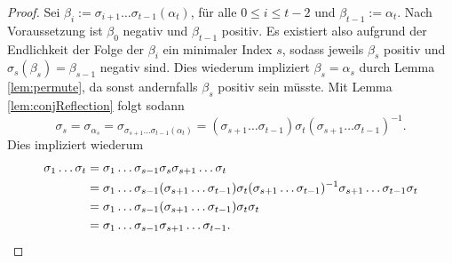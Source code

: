 \begin{proof}
  Sei $\beta_i := \sigma_{i + 1} \dots \sigma_{t-1}(\alpha_t)$, für alle $0 \leq i \leq t - 2$ und $\beta_{t - 1} := \alpha_t$.
  Nach Voraussetzung ist $\beta_0$ negativ und $\beta_{t - 1}$ positiv.
  Es existiert also aufgrund der Endlichkeit der Folge der $\beta_i$ ein minimaler Index $s$, sodass jeweils $\beta_s$ positiv und $\sigma_s(\beta_s) = \beta_{s - 1}$ negativ sind.
  Dies wiederum impliziert $\beta_s = \alpha_s$ durch Lemma \ref{lem:permute}, da sonst andernfalls $\beta_s$ positiv sein müsste.
  Mit Lemma \ref{lem:conjReflection} folgt sodann
  \begin{displaymath}
    \sigma_s 
    = \sigma_{\alpha_s} 
    = \sigma_{\sigma_{s+1} \dots \sigma_{t - 1}(\alpha_t)}
    = (\sigma_{s+1} \dots \sigma_{t - 1}) \sigma_{t} (\sigma_{s+1} \dots \sigma_{t - 1})^{-1}.
  \end{displaymath}
  Dies impliziert wiederum
  \begin{align*}
    \sigma_1 \dots \sigma_t 
    &= \sigma_1 \dots \sigma_{s - 1} \sigma_s \sigma_{s+1} \dots \sigma_t \\
    &= \sigma_1 \dots \sigma_{s - 1} (\sigma_{s+1} \dots \sigma_{t - 1}) \sigma_{t} (\sigma_{s+1} \dots \sigma_{t - 1})^{-1} \sigma_{s+1} \dots \sigma_{t - 1} \sigma_t\\
    &= \sigma_1 \dots \sigma_{s - 1} (\sigma_{s+1} \dots \sigma_{t - 1}) \sigma_t  \sigma_t\\
    &= \sigma_1 \dots \sigma_{s - 1} \sigma_{s+1} \dots \sigma_{t - 1}. \qedhere
  \end{align*}
\end{proof}
